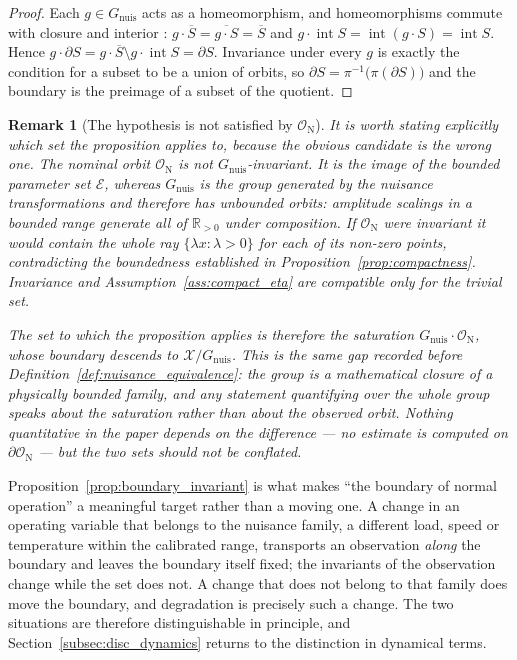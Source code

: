 \documentclass[a4paper]{cas-sc}
\newtheorem{remark}{Remark}
\newcommand{\EtaSpace}{\ensuremath{\mathcal{E}}}
\newcommand{\Gnuis}{\ensuremath{G_{\mathrm{nuis}}}}
\newcommand{\R}{\ensuremath{\mathbb{R}}}
\newcommand{\quotient}{\ensuremath{\mathcal{X}/G_{\mathrm{nuis}}}}
\begin{document}
\begin{proof}
Each \(g\in\Gnuis\) acts as a homeomorphism, and homeomorphisms commute with
closure and interior \citep[Ch.~2]{rudin1976}: \(g\cdot\overline{S}
=\overline{g\cdot S}=\overline{S}\) and
\(g\cdot\operatorname{int}S=\operatorname{int}(g\cdot S)=\operatorname{int}S\).
Hence \(g\cdot\partial S = g\cdot\overline{S}\setminus
g\cdot\operatorname{int}S=\partial S\). Invariance under every \(g\) is
exactly the condition for a subset to be a union of orbits, so
\(\partial S=\pi^{-1}\bigl(\pi(\partial S)\bigr)\) and the boundary is the
preimage of a subset of the quotient.
\end{proof}

\begin{remark}[The hypothesis is not satisfied by \(\mathcal{O}_{\mathrm N}\)]
\label{rem:orbit_not_invariant}
It is worth stating explicitly which set the proposition applies to, because
the obvious candidate is the wrong one. The nominal orbit
\(\mathcal{O}_{\mathrm N}\) is \emph{not} \(\Gnuis\)-invariant. It is the image
of the bounded parameter set \(\EtaSpace\), whereas \(\Gnuis\) is the group
\emph{generated} by the nuisance transformations and therefore has unbounded
orbits: amplitude scalings in a bounded range generate all of
\(\R_{>0}\) under composition. If \(\mathcal{O}_{\mathrm N}\) were invariant it
would contain the whole ray \(\{\lambda x:\lambda>0\}\) for each of its
non-zero points, contradicting the boundedness established in
Proposition~\ref{prop:compactness}. Invariance and
Assumption~\ref{ass:compact_eta} are compatible only for the trivial set.

The set to which the proposition applies is therefore the saturation
\(\Gnuis\cdot\mathcal{O}_{\mathrm N}\), whose boundary descends to
\(\quotient\). This is the same gap recorded before
Definition~\ref{def:nuisance_equivalence}: the group is a mathematical closure
of a physically bounded family, and any statement quantifying over the whole
group speaks about the saturation rather than about the observed orbit.
Nothing quantitative in the paper depends on the difference --- no estimate is
computed on \(\partial\mathcal{O}_{\mathrm N}\) --- but the two sets should not
be conflated.
\end{remark}

Proposition~\ref{prop:boundary_invariant} is what makes ``the boundary of
normal operation'' a meaningful target rather than a moving one. A change in
an operating variable that belongs to the nuisance family, a different load,
speed or temperature within the calibrated range, transports an observation
\emph{along} the boundary and leaves the boundary itself fixed; the invariants
of the observation change while the set does not. A change that does not
belong to that family does move the boundary, and degradation is precisely
such a change. The two situations are therefore distinguishable in principle,
and Section~\ref{subsec:disc_dynamics} returns to the distinction in
dynamical terms.
\end{document}
